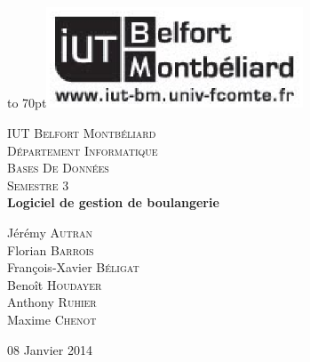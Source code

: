 \documentclass[12pt]{report}
\begin{document}
{
\begin{titlepage}

\vbox to 70pt{\hfill\includegraphics[height=3cm]{images/logo-iut.eps}}\
\begin{center}

\textsc{\LARGE IUT Belfort Montbéliard}\\[0.7cm]
\textsc{\LARGE Département Informatique}\\[1.0cm]
\textsc{\Large Bases De Données}\\[0.5cm]
\textsc{\Large Semestre 3}\\[5cm]


{ \huge \bfseries Logiciel de gestion de boulangerie}\\[5cm]

\begin{large}
Jérémy \textsc{Autran}\\[0.3em]
Florian \textsc{Barrois}\\[0.3em]
François-Xavier \textsc{Béligat}\\[0.3em]
Benoît \textsc{Houdayer}\\[0.3em]
Anthony \textsc{Ruhier}\\[0.3em]
Maxime \textsc{Chenot}\\[0.3em]

\end{large}

\vfill

{\large 08 Janvier 2014}

\end{center}
\end{titlepage}
}

{\clearpage\mbox{}\thispagestyle{empty}\clearpage}
\setcounter{page}{1}
%
{\large{}}












\tableofcontents
{}

%
%
\end{document}
